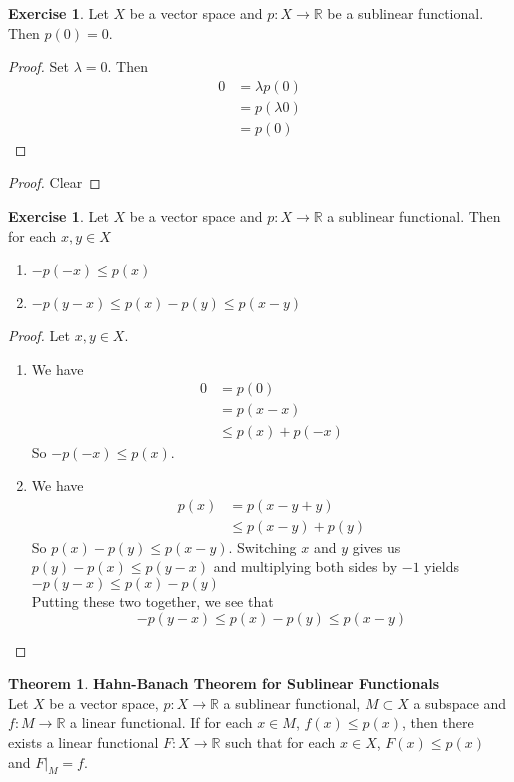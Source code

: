 \documentclass[12pt]{amsart}
\theoremstyle{definition}
\newtheorem{thm}[definition]{Theorem}
\newtheorem{ex}[definition]{Exercise}
\newcommand{\lam}{\lambda}
\newcommand{\R}{\mathbb{R}}
\newcommand{\lex}[1]{\label{ex:#1}}
\begin{document}
	\begin{ex} \lex{55004}
		Let $X$ be a vector space and $p: X \rightarrow \R$ be a sublinear functional. Then $p(0) = 0$.
	\end{ex}
	
	\begin{proof} Set $\lam = 0$. Then 
		\begin{align*}
			0
			&= \lam p(0) \\
			&= p(\lam 0) \\
			&= p(0)
		\end{align*}
	\end{proof}
	
	\begin{proof}
		Clear
	\end{proof}
	
	\begin{ex} \lex{55008}
		Let $X$ be a vector space and $p:X \rightarrow \R$ a sublinear functional. Then for each $x, y \in X$
		\begin{enumerate}
			\item $-p(-x) \leq p(x)$
			\item $- p(y-x) \leq p(x) - p(y) \leq p(x-y)$
		\end{enumerate}
	\end{ex}
	
	\begin{proof}
		Let $x, y \in X$.
		\begin{enumerate}
			\item We have
			\begin{align*}
				0
				&= p(0) \\ 
				&= p(x - x) \\
				& \leq p(x) + p(-x)
			\end{align*}
			So $-p(-x) \leq p(x)$.
			\item We have
			\begin{align*}
				p(x)
				&= p(x -y + y) \\
				& \leq p(x-y) + p(y)
			\end{align*}
			So $p(x) - p(y) \leq p(x-y)$. Switching $x$ and $y$ gives us $p(y) - p(x) \leq p(y-x)$ and multiplying both sides by $-1$ yields $-p(y-x) \leq p(x) - p(y)$ \\ 
			Putting these two together, we see that $$-p(y-x) \leq p(x) - p(y) \leq p(x-y)$$
		\end{enumerate}
	\end{proof}
	
	
	
	\begin{thm}\textbf{Hahn-Banach Theorem for Sublinear Functionals}\\
		Let $X$ be a vector space, $p:X \rightarrow \R$ a sublinear functional, $M \subset X$ a subspace and $f:M \rightarrow \R$ a linear functional. If for each $x \in M$, $ f(x)  \leq p(x)$, then there exists a linear functional $F:X \rightarrow \R$ such that for each $x \in X$, $F(x) \leq p(x)$ and $F|_{M}=f$.
	\end{thm}
	
\end{document}
